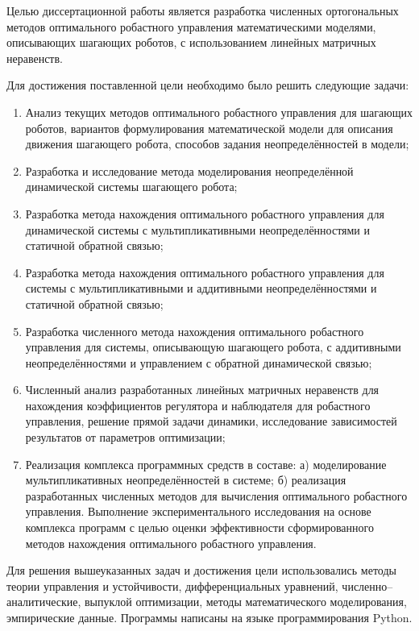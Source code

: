 {\aimtasks} 

Целью диссертационной работы является разработка численных ортогональных методов оптимального робастного управления математическими моделями, описывающих шагающих роботов, с использованием линейных матричных неравенств.

Для достижения поставленной цели необходимо было решить следующие задачи:
\begin{enumerate}[beginpenalty=10000] %
	\item Анализ текущих методов оптимального робастного управления для шагающих роботов, вариантов формулирования математической модели для описания движения шагающего робота, способов задания неопределённостей в модели;
	\item Разработка и исследование метода моделирования неопределённой динамической системы шагающего робота; 
	\item Разработка метода нахождения оптимального робастного управления для динамической системы с мультипликативными неопределённостями и статичной обратной связью;
	\item Разработка метода нахождения оптимального робастного управления для системы с мультипликативными и аддитивными неопределённостями и статичной обратной связью;
	\item Разработка численного метода нахождения оптимального робастного управления для системы, описывающую шагающего робота, с аддитивными неопределённостями и управлением с обратной динамической связью;
	\item Численный анализ разработанных линейных матричных неравенств для нахождения коэффициентов регулятора и наблюдателя для робастного управления, решение прямой задачи динамики, исследование зависимостей результатов от параметров оптимизации;
	\item Реализация комплекса программных средств в составе: а) моделирование мультипликативных неопределённостей в системе; б) реализация разработанных численных методов для вычисления оптимального робастного управления. Выполнение экспериментального исследования на основе комплекса программ с целью оценки эффективности сформированного методов нахождения оптимального робастного управления.
\end{enumerate}

{\methods} 

Для решения вышеуказанных задач и достижения цели использовались методы теории управления и устойчивости, дифференциальных уравнений, численно--аналитические, выпуклой оптимизации, методы математического моделирования, эмпирические данные. Программы написаны на языке программирования Python.


